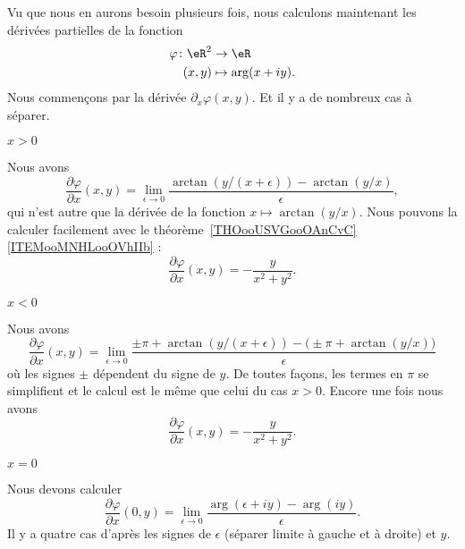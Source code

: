 \begin{normaltext}     \label{NORMooMRBEooVtTcIA}
	Vu que nous en aurons besoin plusieurs fois, nous calculons maintenant les dérivées partielles de la fonction
	\begin{equation}
		\begin{aligned}
			\varphi\colon \eR^2 & \to \eR             \\
			(x,y)               & \mapsto \arg(x+iy).
		\end{aligned}
	\end{equation}
	Nous commençons par la dérivée \( \partial_x\varphi(x,y)\). Et il y a de nombreux cas à séparer.
	\begin{subproof}

		\item[\( x>0\)]

		Nous avons
		\begin{equation}
			\frac{ \partial \varphi }{ \partial x }(x,y)=\lim_{\epsilon\to 0}\frac{ \arctan(y/(x+\epsilon))-\arctan(y/x) }{ \epsilon },
		\end{equation}
		qui n'est autre que la dérivée de la fonction \( x\mapsto\arctan(y/x)\). Nous pouvons la calculer facilement avec le théorème~\ref{THOooUSVGooOAnCvC}\ref{ITEMooMNHLooOVhIIb} :
		\begin{equation}
			\frac{ \partial \varphi }{ \partial x }(x,y)=-\frac{ y }{ x^2+y^2 }.
		\end{equation}

		\item[\( x<0\)]

		Nous avons
		\begin{equation}
			\frac{ \partial \varphi }{ \partial x }(x,y)=\lim_{\epsilon\to 0}\frac{ \pm\pi+\arctan(y/(x+\epsilon))-\big( \pm\pi+\arctan(y/x) \big) }{ \epsilon }
		\end{equation}
		où les signes \( \pm\) dépendent du signe de \( y\). De toutes façons, les termes en \( \pi\) se simplifient et le calcul est le même que celui du cas \( x>0\). Encore une fois nous avons
		\begin{equation}
			\frac{ \partial \varphi }{ \partial x }(x,y)=-\frac{ y }{ x^2+y^2 }.
		\end{equation}

		\item[\( x=0\)]

		Nous devons calculer
		\begin{equation}
			\frac{ \partial \varphi }{ \partial x }(0,y)=\lim_{\epsilon\to 0}\frac{ \arg(\epsilon+ iy)-\arg(iy) }{ \epsilon }.
		\end{equation}
		Il y a quatre cas d'après les signes de \( \epsilon\) (séparer limite à gauche et à droite) et \( y\).


\end{subproof}
\end{normaltext}
